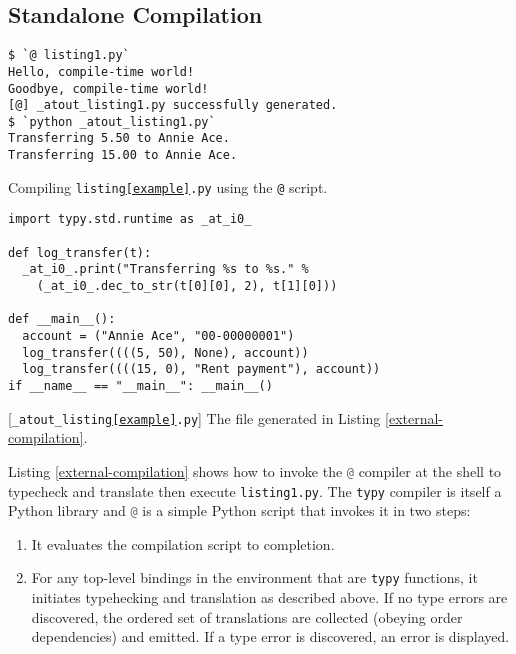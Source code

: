 \documentclass{sigplanconf}
\newcommand{\lip}[1]{\lstinline[language=Python,basicstyle=\ttfamily\small,deletendkeywords={tuple,buffer,map}]{#1}}
\begin{document}
\subsection{Standalone Compilation}\label{compilation} 
\begin{codelisting}[t]
\begin{lstlisting}[style=Bash]
$ `@ listing1.py`
Hello, compile-time world!
Goodbye, compile-time world!
[@] _atout_listing1.py successfully generated.
$ `python _atout_listing1.py`
Transferring 5.50 to Annie Ace.
Transferring 15.00 to Annie Ace.
\end{lstlisting}
\caption{Compiling \texttt{listing\ref{example}.py} using the \texttt{@} script.}
\label{external-compilation}
\end{codelisting}
\begin{codelisting}[t]
\begin{lstlisting}
import typy.std.runtime as _at_i0_

def log_transfer(t):
  _at_i0_.print("Transferring %s to %s." % 
    (_at_i0_.dec_to_str(t[0][0], 2), t[1][0]))

def __main__():
  account = ("Annie Ace", "00-00000001")
  log_transfer((((5, 50), None), account))
  log_transfer((((15, 0), "Rent payment"), account))
if __name__ == "__main__": __main__()
\end{lstlisting}
\caption{[\texttt{\_atout\_listing\ref{example}.py}] The file generated in Listing \ref{external-compilation}.}
\label{example-out}
\end{codelisting}


Listing \ref{external-compilation} shows how to invoke the \lip{@} compiler at the shell to typecheck and translate then execute \lip{listing1.py}. %
The \texttt{typy} compiler is itself a Python library and \lip{@} is a simple Python script that invokes it in two steps:
\begin{enumerate}
\item It evaluates the compilation script to completion.
\item For any top-level bindings in the environment that are \texttt{typy} functions, it initiates typehecking and translation as described above. If no type errors are discovered, the ordered set of translations are collected (obeying order dependencies) and emitted. If a type error is discovered, an error is displayed.
\end{enumerate}
\end{document}
